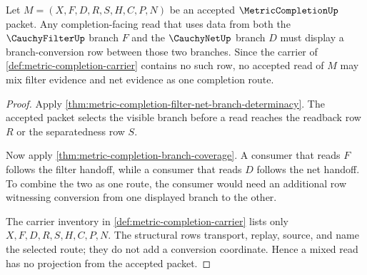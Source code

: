 \begin{theorem}
\label{thm:metric-completion-branch-conversion-refusal}
Let $M=(X,F,D,R,S,H,C,P,N)$ be an accepted $\MetricCompletionUp$ packet. Any completion-facing read that uses data from both the $\CauchyFilterUp$ branch $F$ and the $\CauchyNetUp$ branch $D$ must display a branch-conversion row between those two branches. Since the carrier of \autoref{def:metric-completion-carrier} contains no such row, no accepted read of $M$ may mix filter evidence and net evidence as one completion route.
\end{theorem}
\begin{proof}
Apply \autoref{thm:metric-completion-filter-net-branch-determinacy}. The accepted packet selects the visible branch before a read reaches the readback row $R$ or the separatedness row $S$.

Now apply \autoref{thm:metric-completion-branch-coverage}. A consumer that reads $F$ follows the filter handoff, while a consumer that reads $D$ follows the net handoff. To combine the two as one route, the consumer would need an additional row witnessing conversion from one displayed branch to the other.

The carrier inventory in \autoref{def:metric-completion-carrier} lists only $X,F,D,R,S,H,C,P,N$. The structural rows transport, replay, source, and name the selected route; they do not add a conversion coordinate. Hence a mixed read has no projection from the accepted packet.
\end{proof}

